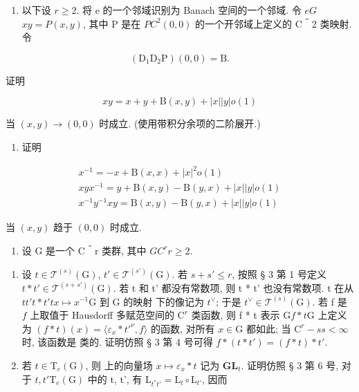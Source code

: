 \begin{enumerate}
\def\labelenumi{(\alph{enumi})}
\tightlist
\item
  以下设 \(r \geqslant 2\). 将 e 的一个邻域识别为 Banach 空间的一个邻域. 令 \(e\)\(G\)\(xy = P(x, y)\), 其中 P 是在 \(P\)\(C^2\)\((0, 0)\) 的一个开邻域上定义的 C＾2 类映射. 令
\end{enumerate}

\[
\left(\mathrm{D} _ {1} \mathrm{D} _ {2} \mathrm{P}\right) (0, 0) = \mathrm{B}.
\]

证明

\[
x y = x + y + \mathrm{B} (x, y) + | x | | y | o (1)
\]

当 \((x,y)\to (0,0)\) 时成立. (使用带积分余项的二阶展开.)

\begin{enumerate}
\def\labelenumi{(\alph{enumi})}
\setcounter{enumi}{1}
\tightlist
\item
证明
\end{enumerate}

\[
\begin{array}{c} x ^ {- 1} = - x + \mathrm{B} (x, x) + | x | ^ {2} o (1) \\ x y x ^ {- 1} = y + \mathrm{B} (x, y) - \mathrm{B} (y, x) + | x | | y | o (1) \\ x ^ {- 1} y ^ {- 1} x y = \mathrm{B} (x, y) - \mathrm{B} (y, x) + | x | | y | o (1) \end{array}
\]

当 \((x,y)\) 趋于 \((0,0)\) 时成立.

\begin{enumerate}
\def\labelenumi{\arabic{enumi}.}
\setcounter{enumi}{1}
\tightlist
\item
  设 G 是一个 C＾r 类群, 其中 \(G\)\(C^r\)\(r \geqslant 2\).
\end{enumerate}

\begin{enumerate}
\def\labelenumi{(\alph{enumi})}
\item
  设 \(t \in \mathcal{T}^{(s)}(\mathrm{G})\), \(t' \in \mathcal{T}^{(s')}(\mathrm{G})\). 若 \(s + s' \leqslant r\), 按照 § 3 第 1 号定义 \(t * t' \in \mathcal{T}^{(s + s')}(\mathrm{G})\). 若 t 和 t' 都没有常数项, 则 t * t' 也没有常数项. t 在从 \(t\)\(t'\)\(t * t'\)\(t\)\(x \mapsto x^{-1}\)\(\mathrm{G}\) 到 \(\mathrm{G}\) 的映射  下的像记为 \(t^{\vee}\); 于是 \(t^{\vee} \in \mathcal{T}^{(s)}(\mathrm{G})\). 若 f 是 \(f\) 上取值于 Hausdorff 多赋范空间的 \(\mathrm{C}^r\) 类函数, 则 f * t 表示 \(\mathrm{G}\)\(f * t\)\(\mathrm{G}\) 上定义为 \((f * t)(x) = \langle \varepsilon_x * t'^{\nu}, f \rangle\) 的函数, 对所有 \(x \in \mathrm{G}\) 都如此; 当 \(\mathrm{C}^r - s\)\(s < \infty\) 时, 该函数是  类的. 证明仿照 § 3 第 4 号可得 \(f * (t * t') = (f * t) * t'\).
\item
  若 \(t \in \mathrm{T}_e(\mathrm{G})\), 则  上的向量场 \(x \mapsto \varepsilon_x * t\) 记为 \(\mathbf{G}\)\(\mathbf{L}_t\). 证明仿照 § 3 第 6 号, 对于 \(t, t'\)\(\mathrm{T}_e(\mathrm{G})\) 中的 t, t', 有 \(\mathrm{L}_{t^* t'} = \mathrm{L}_t \circ \mathrm{L}_{t'}\), 因而
\end{enumerate}

